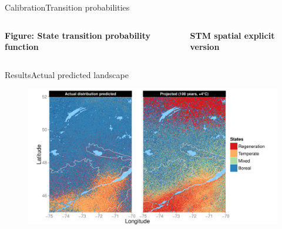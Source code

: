 \documentclass[10pt,aspectratio=149]{beamer}
\begin{document}

\begin{frame}{Calibration}{Transition probabilities}

\begin{columns}[c]
	\begin{column}[c]{.40\paperwidth}

	\textbf{Figure: State transition probability function}

	\end{column}
	\begin{column}[c]{.40\paperwidth}
		
	\textbf{STM spatial explicit version}
	
	\end{column}
\end{columns}

\end{frame}



\begin{frame}[t]{Results}{Actual predicted landscape}

		\begin{figure}
			\vspace{-1.5em}
			\includegraphics[height=0.79\paperheight]{Figs/outModel.pdf}
		\end{figure}

\end{frame}

\end{document}
